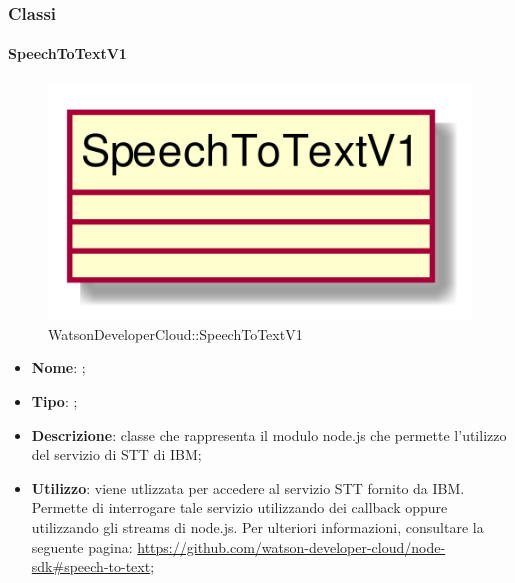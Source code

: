 \subsubsection{Classi}
\hypertarget{SpeechToTextV1_label}{\paragraph{SpeechToTextV1}}
\begin{figure}[h]
	\centering
	\includegraphics[width=\textwidth,height=\textheight,keepaspectratio]{images/ClassSpeechToTextV1.png}
	\caption{WatsonDeveloperCloud::SpeechToTextV1}
\end{figure}
\begin{itemize}
	\item \textbf{Nome}: ;
	\item \textbf{Tipo}: ;
	\item \textbf{Descrizione}: classe che rappresenta il modulo node.js che permette l'utilizzo del servizio di STT di IBM;
	\item \textbf{Utilizzo}: viene utlizzata per accedere al servizio STT fornito da IBM. Permette di interrogare tale servizio utilizzando dei callback oppure utilizzando gli streams di node.js. Per ulteriori informazioni, consultare la seguente pagina: \url{https://github.com/watson-developer-cloud/node-sdk#speech-to-text};
\end{itemize}
\FloatBarrier
